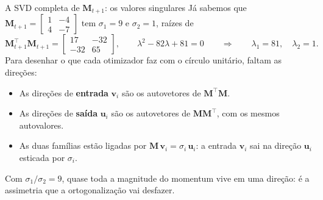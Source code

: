 \documentclass[aspectratio=169,xcolor=dvipsnames]{beamer}
\begin{document}
  \begin{frame}{A SVD completa de $\mathbf{M}_{t+1}$: os valores singulares}
    Já sabemos que $\mathbf{M}_{t+1}=\begin{bmatrix}1&-4\\4&-7\end{bmatrix}$ tem $\sigma_1=9$ e $\sigma_2=1$, raízes de
    \[
      \mathbf{M}_{t+1}^{\top}\mathbf{M}_{t+1}=\begin{bmatrix}17&-32\\-32&65\end{bmatrix},
      \qquad
      \lambda^{2}-82\lambda+81=0
      \qquad\Longrightarrow\qquad
      \lambda_1=81,\quad \lambda_2=1.
    \]
    Para desenhar o que cada otimizador faz com o círculo unitário, faltam as \alert{direções}:
    \begin{itemize}
      \item As direções de \textbf{entrada} $\mathbf{v}_i$ são os autovetores de $\mathbf{M}^{\top}\mathbf{M}$.
      \item As direções de \textbf{saída} $\mathbf{u}_i$ são os autovetores de $\mathbf{M}\mathbf{M}^{\top}$, com os mesmos autovalores.
      \item As duas famílias estão ligadas por $\mathbf{M}\,\mathbf{v}_i=\sigma_i\,\mathbf{u}_i$: a entrada $\mathbf{v}_i$
        sai na direção $\mathbf{u}_i$ esticada por $\sigma_i$.
    \end{itemize}
    Com $\sigma_1/\sigma_2=9$, quase toda a magnitude do momentum vive em uma direção: é a assimetria que
    a ortogonalização vai desfazer.
  \end{frame}
\end{document}
